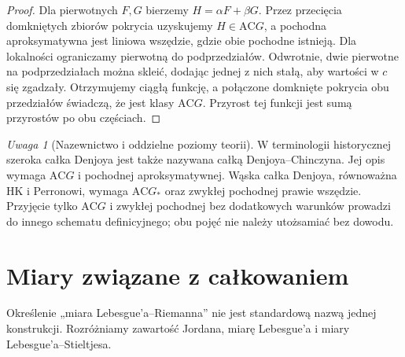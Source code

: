 \documentclass[11pt,a4paper]{article}
\numberwithin{equation}{section}
\theoremstyle{plain}
\theoremstyle{definition}
\theoremstyle{remark}
\newtheorem{uwaga}[twierdzenie]{Uwaga}
\newcommand{\AC}{\mathrm{AC}}
\begin{document}
\begin{proof}
Dla pierwotnych $F,G$ bierzemy $H=\alpha F+\beta G$. Przez przecięcia domkniętych zbiorów pokrycia uzyskujemy $H\in\AC G$, a pochodna aproksymatywna jest liniowa wszędzie, gdzie obie pochodne istnieją. Dla lokalności ograniczamy pierwotną do podprzedziałów. Odwrotnie, dwie pierwotne na podprzedziałach można skleić, dodając jednej z nich stałą, aby wartości w $c$ się zgadzały. Otrzymujemy ciągłą funkcję, a połączone domknięte pokrycia obu przedziałów świadczą, że jest klasy $\AC G$. Przyrost tej funkcji jest sumą przyrostów po obu częściach.
\end{proof}
\begin{uwaga}[Nazewnictwo i oddzielne poziomy teorii]
W terminologii historycznej szeroka całka Denjoya jest także nazywana całką Denjoya--Chinczyna. Jej opis wymaga $\AC G$ i pochodnej aproksymatywnej. Wąska całka Denjoya, równoważna HK i Perronowi, wymaga $\AC G_*$ oraz zwykłej pochodnej prawie wszędzie. Przyjęcie tylko $\AC G$ i zwykłej pochodnej bez dodatkowych warunków prowadzi do innego schematu definicyjnego; obu pojęć nie należy utożsamiać bez dowodu.
\end{uwaga}

\section{Miary związane z całkowaniem}
Określenie „miara Lebesgue'a--Riemanna” nie jest standardową nazwą jednej konstrukcji. Rozróżniamy zawartość Jordana, miarę Lebesgue'a i miary Lebesgue'a--Stieltjesa.
\end{document}
